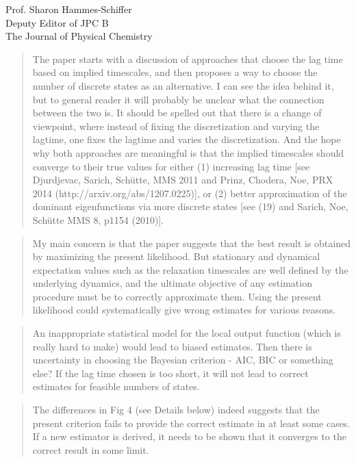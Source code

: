 \documentclass{letter}
\begin{document}
\begin{letter}{Prof. Sharon Hammes-Schiffer \\ Deputy Editor of JPC B \\ The Journal of Physical Chemistry}
\begin{quote}
The paper starts with a discussion of approaches that choose the lag time based on implied timescales, and then proposes a way to choose the number of discrete states as an alternative. I can see the idea behind it, but to general reader it will probably be unclear what the connection between the two is. It should be spelled out that there is a change of viewpoint, where instead of fixing the discretization and varying the lagtime, one fixes the lagtime and varies the discretization. And the hope why both approaches are meaningful is that the implied timescales should converge to their true values for either (1) increasing lag time [see Djurdjevac, Sarich, Schütte, MMS 2011 and Prinz, Chodera, Noe, PRX 2014 (http://arxiv.org/abs/1207.0225)], or (2) better approximation of the dominant eigenfunctions via more discrete states [see (19) and Sarich, Noe, Sch\"{u}tte MMS 8, p1154 (2010)].
\end{quote}

\begin{quote}
My main concern is that the paper suggests that the best result is obtained by maximizing the present likelihood. But stationary and dynamical expectation values such as the relaxation timescales are well defined by the underlying dynamics, and the ultimate objective of any estimation procedure must be to correctly approximate them. Using the present likelihood could systematically give wrong estimates for various reasons. 
\end{quote}

\begin{quote}
An inappropriate statistical model for the local output function (which is really hard to make) would lead to biased estimates. Then there is uncertainty in choosing the Bayesian criterion - AIC, BIC or something else? If the lag time chosen is too short, it will not lead to correct estimates for feasible numbers of states.
\end{quote}

\begin{quote}
The differences in Fig 4 (see Details below) indeed suggests that the present criterion fails to provide the correct estimate in at least some cases. If a new estimator is derived, it needs to be shown that it converges to the correct result in some limit. 
\end{quote}


\end{letter}
\end{document}
